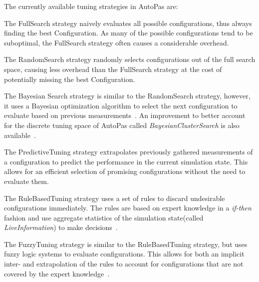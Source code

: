 \documentclass[conference]{IEEEtran}
\begin{document}
The currently available tuning strategies in AutoPas are:

\begin{description}[style=nextline]
    \item[FullSearch]
        The FullSearch strategy naively evaluates all possible configurations, thus always finding the best Configuration. As many of the possible configurations tend to be suboptimal\cite{Manuel_Lerchner_Thesis.pdf}, the FullSearch strategy often causes a considerable overhead.

    \item[RandomSearch]
        The RandomSearch strategy randomly selects configurations out of the full search space, causing less overhead than the FullSearch strategy at the cost of potentially missing the best Configuration.

    \item[BayesianSearch]
        The Bayesian Search strategy is similar to the RandomSearch strategy, however, it uses a Bayesian optimization algorithm to select the next configuration to evaluate based on previous measurements~\cite{njan_master}. An improvement to better account for the discrete tuning space of AutoPas called \textit{BayesianClusterSearch} is also available~\cite{autopas_issue673}.

    \item[PredictiveTuning]
        The PredictiveTuning strategy extrapolates previously gathered measurements of a configuration to predict the performance in the current simulation state. This allows for an efficient selection of promising configurations without the need to evaluate them.

    \item[RuleBasedTuning]
        The RuleBasedTuning strategy uses a set of rules to discard undesirable configurations immediately. The rules are based on expert knowledge in a \textit{if-then} fashion and use aggregate statistics of the simulation state(called \textit{LiveInformation}) to make decisions~\cite{endreport.pdf}.

    \item[FuzzyTuning]
        The FuzzyTuning strategy is similar to the RuleBasedTuning strategy, but uses fuzzy logic systems to evaluate configurations. This allows for both an implicit inter- and extrapolation of the rules to account for configurations that are not covered by the expert knowledge~\cite{Manuel_Lerchner_Thesis.pdf}.

\end{description}
\end{document}
